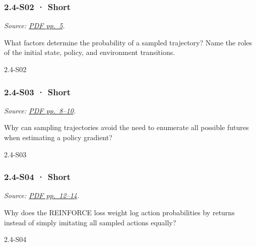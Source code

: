 \noindent\begin{minipage}{\linewidth}

\subsubsection{2.4-S02 · Short}\label{s02-short-6}

\emph{Source:
\href{../Lecture\%20Slides/2.4.\%20Policy\%20Search.pdf\#page=5}{PDF
pp.~5}.}

What factors determine the probability of a sampled trajectory? Name the
roles of the initial state, policy, and environment transitions.

\begin{solution}[20mm]{2.4-S02}

\end{solution}
\end{minipage}\par\medskip

\noindent\begin{minipage}{\linewidth}

\subsubsection{2.4-S03 · Short}\label{s03-short-6}

\emph{Source:
\href{../Lecture\%20Slides/2.4.\%20Policy\%20Search.pdf\#page=8}{PDF
pp.~8--10}.}

Why can sampling trajectories avoid the need to enumerate all possible
futures when estimating a policy gradient?

\begin{solution}[20mm]{2.4-S03}

\end{solution}
\end{minipage}\par\medskip

\noindent\begin{minipage}{\linewidth}

\subsubsection{2.4-S04 · Short}\label{s04-short-6}

\emph{Source:
\href{../Lecture\%20Slides/2.4.\%20Policy\%20Search.pdf\#page=12}{PDF
pp.~12--14}.}

Why does the REINFORCE loss weight log action probabilities by returns
instead of simply imitating all sampled actions equally?

\begin{solution}[20mm]{2.4-S04}

\end{solution}
\end{minipage}\par\medskip

